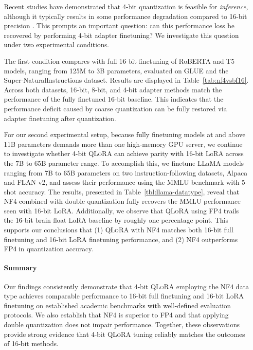 Recent studies have demonstrated that 4-bit quantization is feasible for \emph{inference}, although it typically results in some performance degradation compared to 16-bit precision \citep{dettmers2022case,frantar2022gptq}. This prompts an important question: can this performance loss be recovered by performing 4-bit adapter finetuning? We investigate this question under two experimental conditions.

The first condition compares with full 16-bit finetuning of RoBERTA and T5 models, ranging from 125M to 3B parameters, evaluated on GLUE and the Super-NaturalInstructions dataset. Results are displayed in Table~\ref{tab:nf4vsbf16}. Across both datasets, 16-bit, 8-bit, and 4-bit adapter methods match the performance of the fully finetuned 16-bit baseline. This indicates that the performance deficit caused by coarse quantization can be fully restored via adapter finetuning after quantization.

For our second experimental setup, because fully finetuning models at and above 11B parameters demands more than one high-memory GPU server, we continue to investigate whether 4-bit \textsc{QLoRA} can achieve parity with 16-bit LoRA across the 7B to 65B parameter range. To accomplish this, we finetune LLaMA models ranging from 7B to 65B parameters on two instruction-following datasets, Alpaca and FLAN v2, and assess their performance using the MMLU benchmark with 5-shot accuracy. The results, presented in Table~\ref{tbl:llama-datatype}, reveal that NF4 combined with double quantization fully recovers the MMLU performance seen with 16-bit LoRA. Additionally, we observe that \textsc{QLoRA} using FP4 trails the 16-bit brain float LoRA baseline by roughly one percentage point. This supports our conclusions that (1) \textsc{QLoRA} with NF4 matches both 16-bit full finetuning and 16-bit LoRA finetuning performance, and (2) NF4 outperforms FP4 in quantization accuracy.

\paragraph{Summary} Our findings consistently demonstrate that 4-bit \textsc{QLoRA} employing the NF4 data type achieves comparable performance to 16-bit full finetuning and 16-bit LoRA finetuning on established academic benchmarks with well-defined evaluation protocols. We also establish that NF4 is superior to FP4 and that applying double quantization does not impair performance. Together, these observations provide strong evidence that 4-bit \textsc{QLoRA} tuning reliably matches the outcomes of 16-bit methods.

